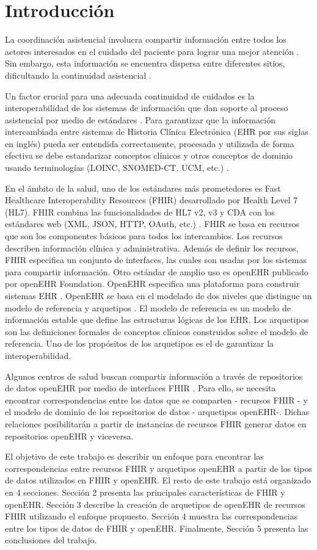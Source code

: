\section{Introducción}

La coordinación asistencial involucra compartir información entre todos los actores interesados en el cuidado del paciente para lograr una mejor atención \cite{CareCoordination}. Sin embargo, esta información se encuentra dispersa entre diferentes sitios, dificultando la continuidad asistencial \cite{Indarte11}.

Un factor crucial para una adecuada continuidad de cuidados es la interoperabilidad de los sistemas de información que dan soporte al proceso asistencial por medio de estándares \cite{OPS16}. Para garantizar que la información intercambiada entre sistemas de Historia Clínica Electrónica (EHR por sus siglas en inglés) pueda ser entendida correctamente, procesada y utilizada de forma efectiva se debe estandarizar conceptos clínicos y otros conceptos de dominio usando terminologías (LOINC, SNOMED-CT, UCM, etc.) \cite{ISO20514}.

En el ámbito de la salud, uno de los estándares más prometedores es Fast Healthcare Interoperability Resources (FHIR) desarrollado por Health Level 7 (HL7). FHIR combina las funcionalidades de HL7 v2, v3 y CDA con los estándares web (XML, JSON, HTTP, OAuth, etc.) \cite{FHIR}. FHIR se basa en recursos que son los componentes básicos para todos los intercambios. Los recursos describen información clínica y administrativa. Además de definir los recursos, FHIR especifica un conjunto de interfaces, las cuales son usadas por los sistemas para compartir información. Otro estándar de amplio uso es openEHR publicado por openEHR Foundation. OpenEHR especifica una plataforma para construir sistemas EHR \cite{openEHR}. OpenEHR se basa en el modelado de dos niveles que distingue un modelo de referencia y arquetipos \cite{Bale00}. El modelo de referencia es un modelo de información estable que define las estructuras lógicas de los EHR. Los arquetipos son las definiciones formales de conceptos clínicos construidos sobre el modelo de referencia. Uno de los propósitos de los arquetipos es el de garantizar la interoperabilidad.

Algunos centros de salud buscan compartir información a través de repositorios de datos openEHR por medio de interfaces FHIR \cite{Lopez16}. Para ello, se necesita encontrar correspondencias entre los datos que se comparten - recursos FHIR - y el modelo de dominio de los repositorios de datos - arquetipos openEHR-. Dichas relaciones posibilitarán a partir de instancias de recursos FHIR generar datos en repositorios openEHR y viceversa.

El objetivo de este trabajo es describir un enfoque para encontrar las correspondencias entre recursos FHIR y arquetipos openEHR a partir de los tipos de datos utilizados en FHIR y openEHR. El resto de este trabajo está organizado en 4 secciones. Sección 2 presenta las principales características de FHIR y openEHR. Sección 3 describe la creación de arquetipos de openEHR de recursos FHIR utilizando el enfoque propuesto. Sección 4 muestra las correspondencias entre los tipos de datos de FHIR y openEHR. Finalmente, Sección 5 presenta las conclusiones del trabajo.
